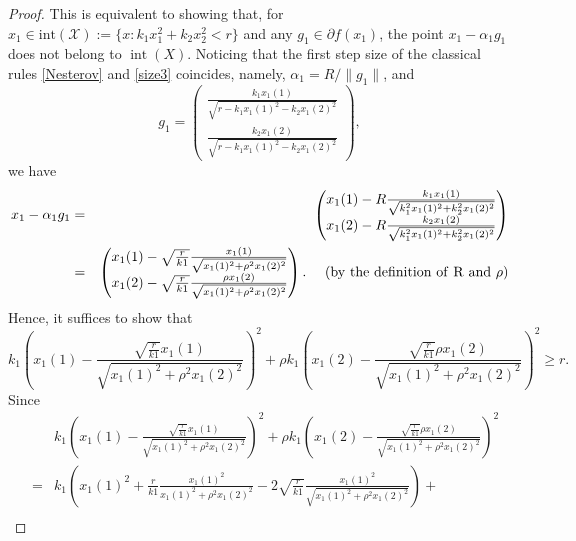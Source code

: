 \documentclass[sn-mathphys]{JORSC-jnl}%
\theoremstyle{thmstyleone}%
\theoremstyle{thmstylethree}%
\begin{document}
\begin{proof}
	This is equivalent to showing that, for $x_1 \in \text{int}(\mathcal{X}) := \{ x : k_1 x_1^2 + k_2 x_2^2 < r \}$ and any $g_1 \in \partial f(x_1)$, the point $x_1 - \alpha_1 g_1$ does not belong to $\operatorname{int}(X)$. Noticing that the first step size of the classical rules \eqref{Nesterov} and \eqref{size3} coincides, namely, $\alpha_1 = R / \|g_1\|$, and
	\begin{equation*}
		g_1 =
		\begin{pmatrix}
			\frac{k_1 x_1(1)}{\sqrt{r - k_1 x_1(1)^{2} - k_2 x_1(2)^{2}}} \\
			\frac{k_2 x_1(2)}{\sqrt{r - k_1 x_1(1)^{2} - k_2 x_1(2)^{2}}}
		\end{pmatrix},
	\end{equation*}
	we have 
	\begin{eqnarray}
		x_1 - \alpha_1 g_1 &=&
		\begin{pmatrix}
			x_1(1) - R\frac{k_1 x_1(1)}{\sqrt{k_1^{2} x_1(1)^{2} + k_2^{2} x_1(2)^{2}}} \\
			x_1(2) - R\frac{k_2 x_1(2)}{\sqrt{k_1^{2} x_1(1)^{2} + k_2^{2} x_1(2)^{2}}}
		\end{pmatrix}\nonumber\\
		&=&
		\begin{pmatrix}
			x_1(1) - \sqrt{\frac{r}{k1}}\frac{x_1(1)}{\sqrt{x_1(1)^{2} + \rho^{2} x_1(2)^{2}}} \\
			x_1(2) - \sqrt{\frac{r}{k1}}\frac{\rho x_1(2)}{\sqrt{x_1(1)^{2} + \rho^{2} x_1(2)^{2}}}
		\end{pmatrix}. \nonumber~~~~({\rm by ~the~ definition~ of~  R~ and ~ \rho})
	\end{eqnarray}
	Hence, it suffices to show that
	\begin{equation*}
		k_1 \left(x_1(1) - \frac{\sqrt{\frac{r}{k1}}x_1(1)}{\sqrt{x_1(1)^{2} + \rho^{2} x_1(2)^{2}}}\right)^2 + \rho k_1 \left(x_1(2) - \frac{\sqrt{\frac{r}{k1}}\rho x_1(2)}{\sqrt{x_1(1)^{2} + \rho^{2} x_1(2)^{2}}}\right)^2 \geq r.
	\end{equation*}
	Since 
	\begin{eqnarray}
		&&k_1 \left(x_1(1) - \frac{\sqrt{\frac{r}{k1}}x_1(1)}{\sqrt{x_1(1)^{2} + \rho^{2} x_1(2)^{2}}}\right)^2 + \rho k_1 \left(x_1(2) - \frac{\sqrt{\frac{r}{k1}}\rho x_1(2)}{\sqrt{x_1(1)^{2} + \rho^{2} x_1(2)^{2}}}\right)^2 \nonumber\\
		&=& k_1 \left(x_1(1)^2 + \frac{r}{k1}\frac{x_1(1)^2}{x_1(1)^{2} + \rho^{2} x_1(2)^{2}} - 2\sqrt{\frac{r}{k1}}\frac{x_1(1)^2}{\sqrt{x_1(1)^{2} + \rho^{2} x_1(2)^{2}}}\right) + \nonumber\\

\end{eqnarray}
\end{proof}
\end{document}

